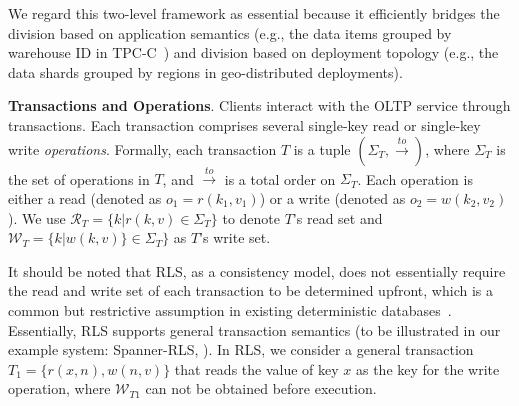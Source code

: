 We regard this two-level framework as essential because it efficiently bridges the division based on application semantics (e.g., the data items grouped by warehouse ID in TPC-C~\cite{tpcc}) and division based on deployment topology (e.g., the data shards grouped by regions in geo-distributed deployments).

\vspace{2pt}
\noindent\textbf{Transactions and Operations}. Clients interact with the OLTP service through transactions. Each transaction comprises several single-key read or single-key write \textit{operations}. Formally, each transaction $T$ is a tuple $(\Sigma_T, \xrightarrow{to})$, where $\Sigma_T$ is the set of operations in $T$, and $\xrightarrow{to}$ is a total order on $\Sigma_T$. Each operation is either a read (denoted as $o_1 = r(k_1, v_1)$) or a write (denoted as $o_2 = w(k_2, v_2)$). We use $\mathcal{R}_T = \{k | r(k, v) \in \Sigma_T\}$ to denote $T$'s read set and $\mathcal{W}_T = \{k | w(k, v)\} \in \Sigma_T\}$ as $T$'s write set. 

It should be noted that RLS, as a consistency model, does not essentially require the read and write set of each transaction to be determined upfront, which is a common but restrictive assumption in existing deterministic databases~\cite{slog:vldb19,calvin:sigmod12,mdcc:eurosys13,epaxos:sosp13, nguyen2023detock}. Essentially, RLS supports general transaction semantics (to be illustrated in our example system: Spanner-RLS, ). In RLS, we consider a general transaction $T_1 = \{r(x, n), w(n, v)\}$ that reads the value of key $x$ as the key for the write operation, where  $\mathcal{W}_{T1}$ can not be obtained before execution.


